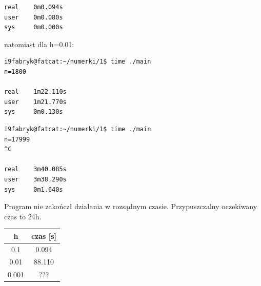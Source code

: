\documentclass[12pt,a4paper]{article}
\begin{document}
\begin{enumerate}
\begin{verbatim}
real    0m0.094s
user    0m0.080s
sys     0m0.000s
\end{verbatim}
natomiast dla h=0.01:
\begin{verbatim}
i9fabryk@fatcat:~/numerki/1$ time ./main 
n=1800

real    1m22.110s
user    1m21.770s
sys     0m0.130s
\end{verbatim}
\begin{verbatim}
i9fabryk@fatcat:~/numerki/1$ time ./main 
n=17999
^C

real    3m40.085s
user    3m38.290s
sys     0m1.640s
\end{verbatim}
Program nie zakończł działania w rozsądnym czasie. Przypuszczalny oczekiwany czas to 24h.

\begin{tabular}{|c|c|}
\hline
h&czas [s]\\
\hline
0.1&0.094\\
0.01&88.110\\
0.001&???\\
\hline
\end{tabular}
\end{enumerate}
\end{document}
